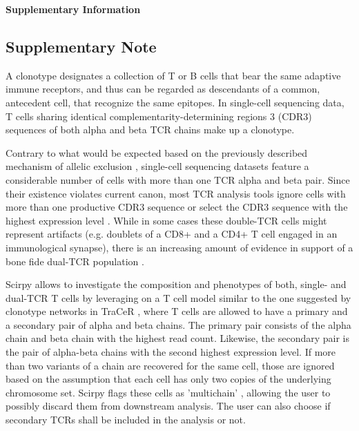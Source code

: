 \documentclass{article}
\begin{document}
\begin{center}
    \normalfont\Large\bfseries{Supplementary Information}
\end{center}
\hspace*{60pt}

\subsection{Supplementary Note}

A clonotype designates a collection of T or B cells that bear the same adaptive immune receptors, and thus can be regarded as descendants of a common, antecedent cell, that recognize the same epitopes. In single-cell sequencing data, T cells sharing identical complementarity-determining regions 3 (CDR3) sequences of both alpha and beta TCR chains make up a clonotype. \par

Contrary to what would be expected based on the previously described mechanism of allelic exclusion \cite{Brady2010-gh}, single-cell sequencing datasets feature a considerable number of cells with more than one TCR alpha and beta pair. Since their existence violates current canon, most TCR analysis tools ignore cells with more than one productive CDR3 sequence \cite{Fischer_undated-cx, Zhang2018-ip} or select the CDR3 sequence with the highest expression level \cite{Afik2017-sg}. While in some cases these double-TCR cells might represent artifacts (e.g. doublets of a CD8+ and a CD4+ T cell engaged in an immunological synapse), there is an increasing amount of evidence in support of a bone fide dual-TCR population \cite{Schuldt2019-ey, Ji2010-bn}. \par

Scirpy allows to investigate the composition and phenotypes of both, single- and dual-TCR T cells by leveraging on a T cell model similar to the one suggested by clonotype networks in TraCeR \cite{Stubbington2016-kh}, where T cells are allowed to have a primary and a secondary pair of alpha and beta chains. The primary pair consists of the alpha chain and beta chain with the highest read count. Likewise, the secondary pair is the pair of alpha-beta chains with the second highest expression level. If more than two variants of a chain are recovered for the same cell, those are ignored based on the assumption that each cell has only two copies of the underlying chromosome set. Scirpy  flags these cells as 'multichain' , allowing the user to possibly discard them from downstream analysis. The user can also choose if secondary TCRs shall be included in the analysis or not.\par
\end{document}
